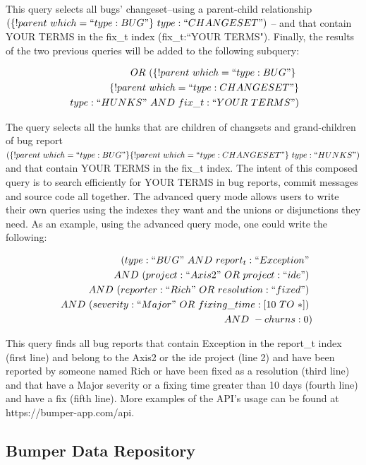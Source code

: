 \documentclass[conference]{IEEEtran}
\begin{document}
This query selects all bugs' changeset--using a parent-child
relationship $(\{!parent~which=``type:BUG"\}~type:
  ``CHANGESET")$ -- and that contain YOUR TERMS in the fix\_t
  index (fix\_t:``YOUR TERMS").
Finally, the results of the two
previous queries will be added to the following subquery:

\begin{equation*}
\begin{split}
  OR~(\{!parent~which=``type:BUG"\}\ \\
~\{!parent~which=``type:CHANGESET"\}\\
~type:``HUNKS"~AND~fix\_t:``YOUR~TERMS")
\end{split}
\end{equation*}

The query selects all the hunks that are children of changsets and
grand-children of bug report $ (\{!parent~which=``type:BUG"\}
  \{!parent~which=``type:CHANGESET"\}~type:``HUNKS")$
and that
contain YOUR TERMS in the fix\_t index.
The intent of this composed query is to search efficiently for
YOUR TERMS in bug reports, commit messages and source
code all together.
The advanced query mode allows users to write their own
queries using the indexes they want and the unions or disjunctions
they need.
As an example, using the advanced query mode, one
could write the following:

\begin{equation*}
\begin{split}
  (type:``BUG"~AND~report_t:``Exception"~\\
~~AND~(project:``Axis2"~OR~project:``ide")~\\
~~AND~(reporter:``Rich"~OR~resolution:``fixed")~\\
~~AND~(severity:``Major"~OR~fixing\_time:[10~TO~*])~\\
~~AND~-churns:0)
\end{split}
\end{equation*}

This query finds all bug reports that contain Exception in the
report\_t index (first line) and belong to the Axis2 or the ide
project (line 2) and have been reported by someone named Rich
or have been fixed as a resolution (third line) and that have a
Major severity or a fixing time greater than 10 days (fourth line)
and have a fix (fifth line).
More examples of the API's usage can
be found at https://bumper-app.com/api.


\subsection{Bumper Data Repository}
\label{sub:Bumper Data Repository}
\end{document}
